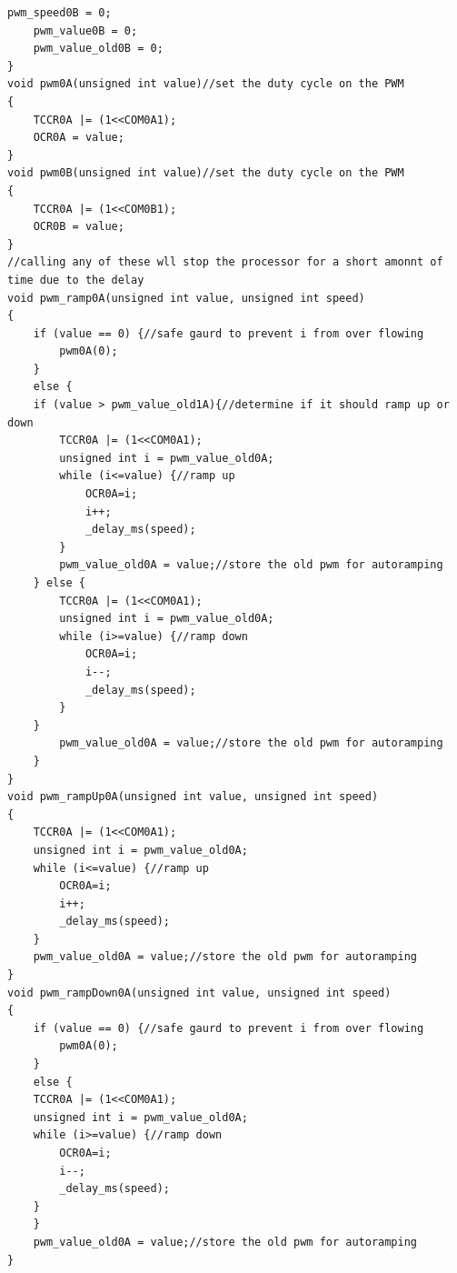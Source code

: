 \documentclass{article}
\begin{document}
\begin{lstlisting}[caption={The PWM function library.},label=pwm,frame=tbl]
    pwm_speed0B = 0;
    pwm_value0B = 0;
    pwm_value_old0B = 0;
}
void pwm0A(unsigned int value)//set the duty cycle on the PWM
{
    TCCR0A |= (1<<COM0A1);
    OCR0A = value;
}
void pwm0B(unsigned int value)//set the duty cycle on the PWM
{
    TCCR0A |= (1<<COM0B1);
    OCR0B = value;
}
//calling any of these wll stop the processor for a short amonnt of time due to the delay
void pwm_ramp0A(unsigned int value, unsigned int speed)
{
    if (value == 0) {//safe gaurd to prevent i from over flowing
        pwm0A(0);
    }
    else {
    if (value > pwm_value_old1A){//determine if it should ramp up or down
        TCCR0A |= (1<<COM0A1);
        unsigned int i = pwm_value_old0A;
        while (i<=value) {//ramp up
            OCR0A=i;
            i++;
            _delay_ms(speed);
        }
        pwm_value_old0A = value;//store the old pwm for autoramping
    } else {
        TCCR0A |= (1<<COM0A1);
        unsigned int i = pwm_value_old0A;
        while (i>=value) {//ramp down
            OCR0A=i;
            i--;
            _delay_ms(speed);
        }
    }
        pwm_value_old0A = value;//store the old pwm for autoramping
    }
}
void pwm_rampUp0A(unsigned int value, unsigned int speed)
{
    TCCR0A |= (1<<COM0A1);
    unsigned int i = pwm_value_old0A;
    while (i<=value) {//ramp up
        OCR0A=i;
        i++;
        _delay_ms(speed);
    }
    pwm_value_old0A = value;//store the old pwm for autoramping
}
void pwm_rampDown0A(unsigned int value, unsigned int speed)
{
    if (value == 0) {//safe gaurd to prevent i from over flowing
        pwm0A(0);
    }
    else {
    TCCR0A |= (1<<COM0A1);
    unsigned int i = pwm_value_old0A;
    while (i>=value) {//ramp down
        OCR0A=i;
        i--;
        _delay_ms(speed);
    }
    }
    pwm_value_old0A = value;//store the old pwm for autoramping
}



\end{lstlisting}
\end{document}
